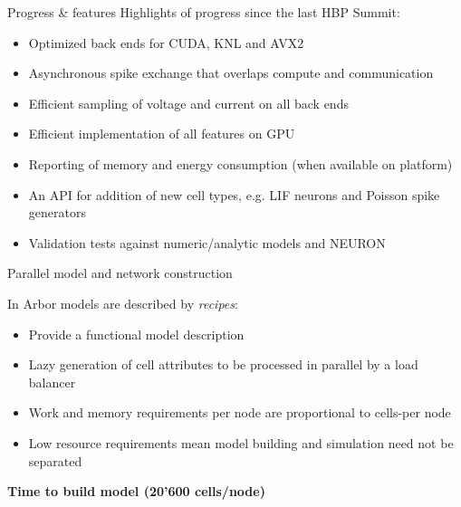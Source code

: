 \documentclass[a0paper,portrait]{baposter}
\newcommand{\arbor}{{\textcolor{blue!30!black}{Arbor}}\xspace}
\newcommand{\newemph}[1]{{\color{blue}\em #1}}
\begin{document}
\begin{poster}
\begin{posterbox}[name=progress,column=1,below=motivation,span=1]{Progress \& features}
    \vspace{4pt}
    Highlights of progress since the last HBP Summit:
    \begin{itemize}
        \item Optimized back ends for CUDA, KNL and AVX2
        \item Asynchronous spike exchange that overlaps compute and communication
        \item Efficient sampling of voltage and current on all back ends
        \item Efficient implementation of all features on GPU
        \item Reporting of memory and energy consumption (when available on platform)
        \item An API for addition of new cell types, e.g. LIF neurons and Poisson spike generators
        \item Validation tests against numeric/analytic models and NEURON
    \end{itemize}
    
    \vspace{4pt}
\end{posterbox}

\begin{posterbox}[name=network,below=progress,column=0,row=0,span=2]{Parallel model and network construction}
    \begin{minipage}[t]{0.5\textwidth}
    \vspace{-4pt}
        In \arbor models are described by \newemph{recipes}:
    \begin{itemize}
        \item Provide a functional model description
        \item Lazy generation of cell attributes to be processed in parallel by a load balancer
        \item Work and memory requirements per node are proportional to cells-per node
        \item Low resource requirements mean model building and simulation need not be separated
    \end{itemize}

   \end{minipage}
    \hspace{10pt}
    \begin{minipage}[t]{0.5\textwidth}
        \begin{center}
            \textbf{Time to build model (20'600 cells/node)}
        \end{center}
        \vspace{-10pt}
        
   \end{minipage}
\end{posterbox}


\end{poster}
\end{document}
